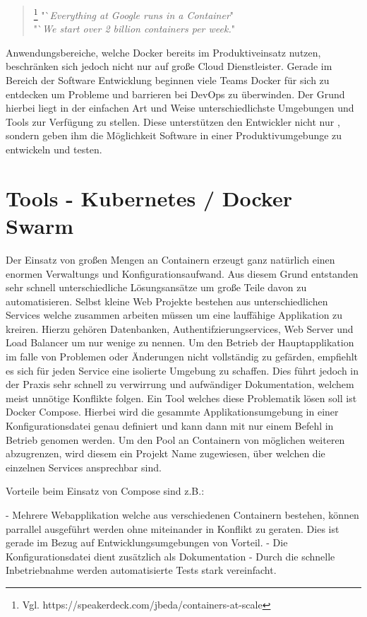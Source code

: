 \documentclass[12pt,toc=bib,toc=listof]{scrreprt}
\begin{document}
\begin{quote}
	\footnote[1]{Vgl. https://speakerdeck.com/jbeda/containers-at-scale}
	"`\textit{Everything at Google runs in a Container}"\\
	"`\textit{We start over 2 billion containers per week.}"
\end{quote}

Anwendungsbereiche, welche Docker bereits im Produktiveinsatz nutzen, beschränken sich jedoch nicht nur auf große Cloud Dienstleister.
Gerade im Bereich der Software Entwicklung beginnen viele Teams Docker für sich zu entdecken um Probleme und barrieren bei DevOps zu überwinden.
Der Grund hierbei liegt in der einfachen Art und Weise unterschiedlichste Umgebungen und Tools zur Verfügung zu stellen.
Diese unterstützen den Entwickler nicht nur , sondern geben ihm die Möglichkeit Software in einer Produktivumgebunge zu entwickeln und testen.

\section{Tools - Kubernetes / Docker Swarm}
Der Einsatz von großen Mengen an Containern erzeugt ganz natürlich einen enormen Verwaltungs und Konfigurationsaufwand.
Aus diesem Grund entstanden sehr schnell unterschiedliche Lösungsansätze um große Teile davon zu automatisieren.
Selbst kleine Web Projekte bestehen aus unterschiedlichen Services welche zusammen arbeiten müssen um eine lauffähige Applikation zu kreiren.
Hierzu gehören Datenbanken, Authentifzierungservices, Web Server und Load Balancer um nur wenige zu nennen.
Um den Betrieb der Hauptapplikation im falle von Problemen oder Änderungen nicht vollständig zu gefärden, empfiehlt es sich für jeden Service eine isolierte Umgebung zu schaffen.
Dies führt jedoch in der Praxis sehr schnell zu verwirrung und aufwändiger Dokumentation, welchem meist unnötige Konflikte folgen.
Ein Tool welches diese Problematik lösen soll ist Docker Compose.
Hierbei wird die gesammte Applikationsumgebung in einer Konfigurationsdatei genau definiert und kann dann mit nur einem Befehl in Betrieb genomen werden.
Um den Pool an Containern von möglichen weiteren abzugrenzen, wird diesem ein Projekt Name zugewiesen, über welchen die einzelnen Services ansprechbar sind.

Vorteile beim Einsatz von Compose sind z.B.:

- Mehrere Webapplikation welche aus verschiedenen Containern bestehen, können parrallel ausgeführt werden ohne miteinander in Konflikt zu geraten.
  Dies ist gerade im Bezug auf Entwicklungsumgebungen von Vorteil.
- Die Konfigurationsdatei dient zusätzlich als Dokumentation
- Durch die schnelle Inbetriebnahme werden automatisierte Tests stark vereinfacht.
\end{document}

